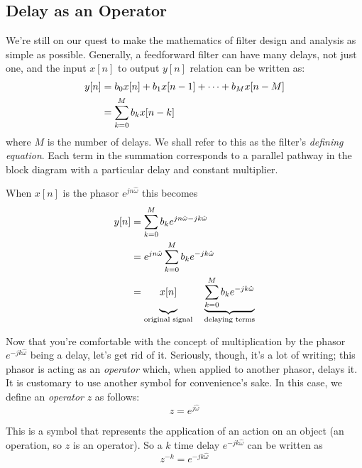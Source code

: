 \subsection{Delay as an Operator} 

We're still on our quest to make the mathematics of filter design and
analysis as simple as possible.  Generally, a feedforward filter can
have many delays, not just one, and the input $x[n]$ to output
$y[n]$ relation can be written as:
\begin{align}
y[n] &= b_0x[n] + b_1x[n-1] + \cdots + b_Mx[n-M] \notag\\
     &= \sum_{k=0}^M b_k x[n-k]
\end{align}
where $M$ is the number of delays. We shall refer to this as the
filter's \emph{defining equation}.
Each term in the summation corresponds to a parallel pathway in the
block diagram with a particular delay and constant multiplier.

When $x[n]$ is the phasor $e^{jn\hat{\omega}}$ this becomes
\begin{align}
y[n] &= \sum_{k=0}^M b_k e^{jn\hat{\omega} - jk\hat{\omega}}\\
     &= e^{jn\hat{\omega}}\sum_{k=0}^M b_k e^{-jk\hat{\omega}}\\
     &= \underbrace{x[n]\vphantom{\sum_{k=0}^M b_k
          e^{-jk\hat{\omega}}}}_{\text{original signal}}
        \quad\underbrace{\sum_{k=0}^M b_k
          e^{-jk\hat{\omega}}}_{\text{delaying terms}}
\label{eq:ff-manyk}
\end{align}

Now that you're comfortable with the concept of multiplication by the
phasor $e^{-jk\hat{\omega}}$ being a delay, let's get rid of
it. Seriously, though, it's a lot of writing; this phasor is acting as
an \emph{operator} which, when applied to another phasor, delays
it. It is customary to use another symbol for convenience's sake. In this case, we
define an \emph{operator} $z$ as follows:
\begin{equation}
z = e^{j\hat{\omega}}
\end{equation}

This is a symbol that represents the application of an action on an
object (an operation, so $z$ is an operator). So a $k$ time delay
$e^{-jk\hat{\omega}}$ can be written as
\begin{equation}
z^{-k} = e^{-jk\hat{\omega}}
\end{equation}

